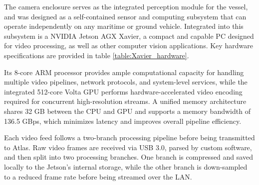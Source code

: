 The camera enclosure serves as the integrated perception module for the vessel, and was designed as a self-contained sensor and computing subsystem that can operate independently on any maritime or ground vehicle. 
Integrated into this subsystem is a NVIDIA Jetson AGX Xavier, a compact and capable PC designed for video processing, as well as other computer vision applications.
Key hardware specifications are provided in table \ref{table:Xavier_hardware}.

Its 8-core ARM processor provides ample computational capacity for handling multiple video pipelines, network protocols, and system-level services, while the integrated 512-core Volta GPU performs hardware-accelerated video encoding required for concurrent high-resolution streams.  
A unified memory architecture shares 32 GB between the CPU and GPU and supports a memory bandwidth of 136.5 GBps, which minimizes latency and improves overall pipeline efficiency.

Each video feed follows a two-branch processing pipeline before being transmitted to Atlas.  
Raw video frames are received via USB 3.0, parsed by custom software, and then split into two processing branches. 
One branch is compressed and saved locally to the Jetson's internal storage, while the other branch is down-sampled to a reduced frame rate before being streamed over the \ac{LAN}.%





